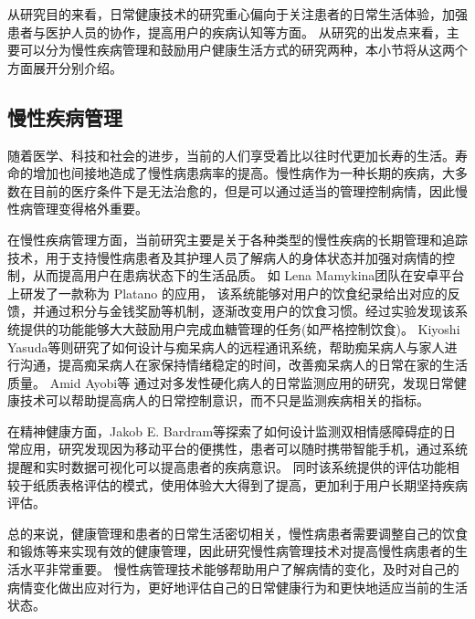 从研究目的来看，日常健康技术的研究重心偏向于关注患者的日常生活体验，加强患者与医护人员的协作，提高用户的疾病认知等方面\cite{nunes2015self-care}。
从研究的出发点来看，主要可以分为慢性疾病管理和鼓励用户健康生活方式的研究两种\cite{nunes2015self-care}，本小节将从这两个方面展开分别介绍。

\subsection{慢性疾病管理}
随着医学、科技和社会的进步，当前的人们享受着比以往时代更加长寿的生活\cite{OlshanskyDEMOGRAPHY}。寿命的增加也间接地造成了慢性病患病率的提高\cite{world2012world}。慢性病作为一种长期的疾病，大多数在目前的医疗条件下是无法治愈的，但是可以通过适当的管理控制病情，因此慢性病管理变得格外重要。

在慢性疾病管理方面，当前研究主要是关于各种类型的慢性疾病的长期管理和追踪技术，用于支持慢性病患者及其护理人员了解病人的身体状态并加强对病情的控制，从而提高用户在患病状态下的生活品质。
如 Lena Mamykina\cite{burgermaster2019personal}团队在安卓平台上研发了一款称为 Platano 的应用，
该系统能够对用户的饮食纪录给出对应的反馈，并通过积分与金钱奖励等机制，逐渐改变用户的饮食习惯。经过实验发现该系统提供的功能能够大大鼓励用户完成血糖管理的任务(如严格控制饮食)。
Kiyoshi Yasuda等\cite{lazar2016evaluation}则研究了如何设计与痴呆病人的远程通讯系统，帮助痴呆病人与家人进行沟通，提高痴呆病人在家保持情绪稳定的时间，改善痴呆病人的日常在家的生活质量。
Amid Ayobi等\cite{ayobi2017quantifying} 通过对多发性硬化病人的日常监测应用的研究，发现日常健康技术可以帮助提高病人的日常控制意识，而不只是监测疾病相关的指标。

在精神健康方面，Jakob E. Bardram等\cite{bardram2013designing}探索了如何设计监测双相情感障碍症的日常应用，研究发现因为移动平台的便携性，患者可以随时携带智能手机，通过系统提醒和实时数据可视化可以提高患者的疾病意识。
同时该系统提供的评估功能相较于纸质表格评估的模式，使用体验大大得到了提高，更加利于用户长期坚持疾病评估。

总的来说，健康管理和患者的日常生活密切相关，慢性病患者需要调整自己的饮食和锻炼等来实现有效的健康管理\cite{nunes2018understanding}，因此研究慢性病管理技术对提高慢性病患者的生活水平非常重要。
慢性病管理技术能够帮助用户了解病情的变化，及时对自己的病情变化做出应对行为，更好地评估自己的日常健康行为和更快地适应当前的生活状态\cite{ayobi2017quantifying}。


